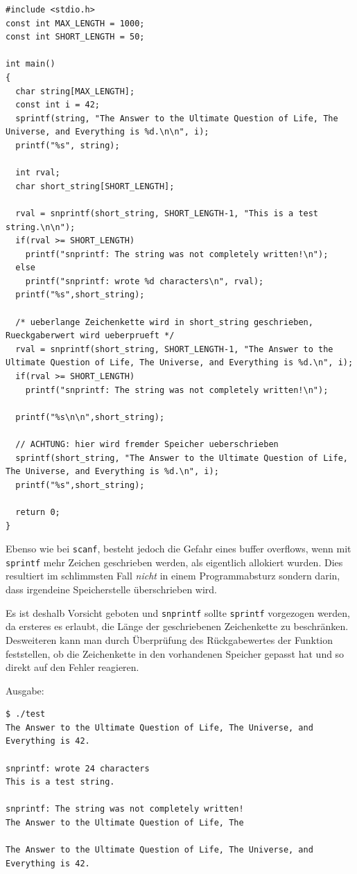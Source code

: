 \begin{lstlisting}
#include <stdio.h>
const int MAX_LENGTH = 1000;
const int SHORT_LENGTH = 50;

int main()
{
  char string[MAX_LENGTH];
  const int i = 42;
  sprintf(string, "The Answer to the Ultimate Question of Life, The Universe, and Everything is %d.\n\n", i);
  printf("%s", string);
  
  int rval;
  char short_string[SHORT_LENGTH];
  
  rval = snprintf(short_string, SHORT_LENGTH-1, "This is a test string.\n\n");
  if(rval >= SHORT_LENGTH) 
    printf("snprintf: The string was not completely written!\n");
  else 
    printf("snprintf: wrote %d characters\n", rval);
  printf("%s",short_string);
  
  /* ueberlange Zeichenkette wird in short_string geschrieben, Rueckgaberwert wird ueberprueft */
  rval = snprintf(short_string, SHORT_LENGTH-1, "The Answer to the Ultimate Question of Life, The Universe, and Everything is %d.\n", i);
  if(rval >= SHORT_LENGTH) 
    printf("snprintf: The string was not completely written!\n");
  
  printf("%s\n\n",short_string);
  
  // ACHTUNG: hier wird fremder Speicher ueberschrieben 
  sprintf(short_string, "The Answer to the Ultimate Question of Life, The Universe, and Everything is %d.\n", i);
  printf("%s",short_string); 
  
  return 0;
}
\end{lstlisting}

Ebenso wie bei \texttt{scanf}, besteht jedoch die Gefahr eines buffer overflows, wenn mit \texttt{sprintf} mehr Zeichen geschrieben werden, als eigentlich allokiert wurden.
Dies resultiert im schlimmsten Fall \emph{nicht} in einem Programmabsturz sondern darin, dass irgendeine Speicherstelle überschrieben wird.

Es ist deshalb Vorsicht geboten und \texttt{snprintf} sollte \texttt{sprintf} vorgezogen werden, da ersteres es erlaubt, die L\"{a}nge der geschriebenen Zeichenkette zu beschr\"{a}nken.
Desweiteren kann man durch \"{U}berpr\"{u}fung des R\"{u}ckgabewertes der Funktion feststellen, ob die Zeichenkette in den vorhandenen Speicher gepasst hat und so direkt auf den Fehler reagieren.

\noindent Ausgabe:
\begin{verbatim}
$ ./test
The Answer to the Ultimate Question of Life, The Universe, and Everything is 42.

snprintf: wrote 24 characters
This is a test string.

snprintf: The string was not completely written!
The Answer to the Ultimate Question of Life, The

The Answer to the Ultimate Question of Life, The Universe, and Everything is 42.
\end{verbatim}


